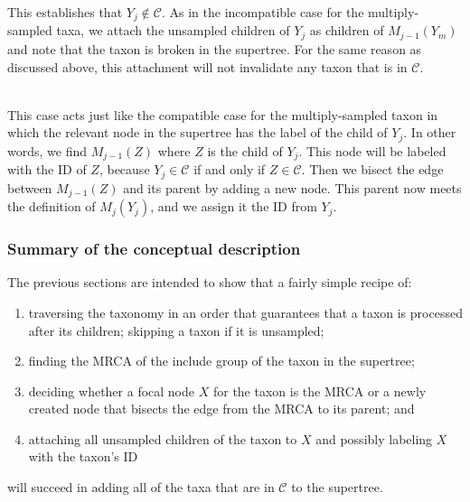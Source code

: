 \documentclass[english]{article}
\begin{document}
This establishes that $Y_j\notin\mathcal{C}$.
As in the incompatible case for the multiply-sampled taxa, we attach
    the unsampled children of $Y_j$ as children of $M_{j-1}(Y_m)$ and note that 
    the taxon is broken in the supertree.
For the same reason as discussed above, this attachment will not invalidate
    any taxon that is in $\mathcal{C}$.

\\
This case acts just like the compatible case for the multiply-sampled taxon in which
    the relevant node in the supertree has the label of the child of $Y_j$.
In other words, we find $M_{j-1}(Z)$ where $Z$ is the child of $Y_j$.
This node will be labeled with the ID of $Z$, because $Y_j\in\mathcal{C}$ if and
    only if $Z\in\mathcal{C}$.
Then we bisect the edge between $M_{j-1}(Z)$ and its parent by adding a new node. 
This parent now meets the definition of $M_{j}(Y_j)$, and we assign it the ID from
    $Y_j$.

\subsubsection{Summary of the conceptual description}
The previous sections are intended to show that a fairly simple recipe of:
\begin{enumerate} 
    \item traversing the taxonomy in an order that guarantees that a taxon 
        is processed after its children;
    \itme skipping a taxon if it is unsampled;
    \item finding the MRCA of the include group of the taxon in the supertree;
    \item deciding whether a focal node $X$ for the taxon is the MRCA or a newly
        created node that bisects the edge from the MRCA to its parent; and
    \item attaching all unsampled children of the taxon to $X$ and possibly
        labeling $X$ with the taxon's ID
\end{enumerate}
will succeed in adding all of the taxa that are in $\mathcal{C}$ to the supertree.
\end{document}
